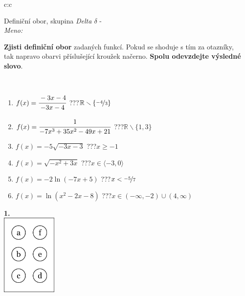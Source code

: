 \documentclass[10pt]{report}
\begin{document}
\begin{tabular}{c:c}
\begin{minipage}[c][104.5mm][t]{0.5\linewidth}
\begin{center}
\vspace{7mm}
{\huge Definiční obor, skupina \textit{Delta $\delta$} -}\\[5mm]
\textit{Meno:}\phantom{xxxxxxxxxxxxxxxxxxxxxxxxxxxxxxxxxxxxxxxxxxxxxxxxxxxxxxxxxxxxxxxxx}\\[5mm]
\begin{minipage}{0.95\linewidth}
\textbf{Zjisti definiční obor} zadaných funkcí. Pokud se shoduje s tím za otazníky,\\tak napravo obarvi příslušející kroužek načerno. \textbf{Spolu odevzdejte výsledné slovo}.
\end{minipage}
\\[1mm]
\begin{minipage}{0.79\linewidth}
\begin{center}
\begin{varwidth}{\linewidth}
\begin{enumerate}
\normalsizerrr
\item $f(x)=\cfrac{-3x-4}{-3x-4}$\quad \dotfill\; ???\;\dotfill \quad $\mathbb{R}\smallsetminus\{\nicefrac{-4}{3}\}$
\item $f(x)=\cfrac{1}{-7x^3+35x^2-49x+21}$\quad \dotfill\; ???\;\dotfill \quad $\mathbb{R}\smallsetminus\{1,3\}$
\item $f(x)=-5\sqrt{-3x-3}$\quad \dotfill\; ???\;\dotfill \quad $x\geq-1$
\item $f(x)=\sqrt{-x^2+3x}$\quad \dotfill\; ???\;\dotfill \quad $x\in\langle-3 , 0\rangle$
\item $f(x)=-2\ln{(-7x+5)}$\quad \dotfill\; ???\;\dotfill \quad $x<\nicefrac{-5}{7}$
\item $f(x)=\ln{(x^2-2x-8)}$\quad \dotfill\; ???\;\dotfill \quad $x\in(-\infty , -2)\cup(4 , \infty)$
\end{enumerate}
\end{varwidth}
\end{center}
\end{minipage}
\begin{minipage}{0.20\linewidth}
\begin{center}
{\Huge\bfseries 1.} \\[2mm]
\includegraphics[height=40mm]{../images/braille.png}

\end{center}
\end{minipage}
\end{center}
\end{minipage}
\end{tabular}
\end{document}

